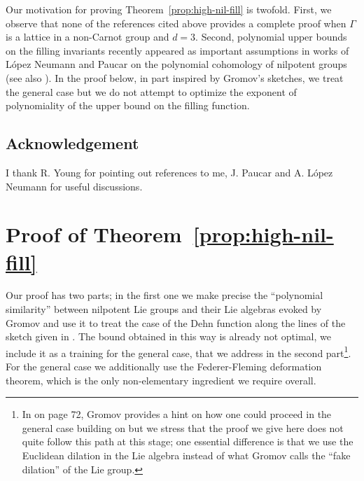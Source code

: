 \documentclass[12pt]{amsart}
\theoremstyle{definition}
\begin{document}
Our motivation for proving Theorem~\ref{prop:high-nil-fill} is twofold. First, we observe that none of the references cited above provides a complete proof when $\Gamma$ is a lattice in a non-Carnot group and $d=3$. Second, polynomial upper bounds on the filling invariants recently appeared as important assumptions in works of L\'opez Neumann and Paucar \cite{neumann2026quantitativepolynomialcohomologyapplications} on the polynomial cohomology of nilpotent groups (see also \cite{bader2026higherkazhdanpropertyunitary}).
In the proof below, in part inspired by Gromov's sketches, we treat the general case but we do not attempt to optimize the exponent of polynomiality of the upper bound on the filling function.

\subsection{Acknowledgement}
I thank R. Young for pointing out references to me, J. Paucar and A. L\'opez Neumann for useful discussions.

\section{Proof of Theorem~\ref{prop:high-nil-fill}}

Our proof has two parts; in the first one we make precise the ``polynomial similarity'' between nilpotent Lie groups and their Lie algebras evoked by Gromov \cite[5.A\textsubscript{2}]{GromovAI} and use it to treat the case of the Dehn function along the lines of the sketch given in \cite[pp.56-57]{GromovAI}. The bound obtained in this way is already not optimal, we include it as a training for the general case, that we address in the second part\footnote{In \cite{GromovAI} on page 72, Gromov provides a hint on how one could proceed in the general case building on \cite[5.A\textsubscript{5}]{GromovAI} but we stress that the proof we give here does not quite follow this path at this stage; one  essential difference is that we use the Euclidean dilation in the Lie algebra instead of what Gromov calls the ``fake dilation'' of the Lie group.}. For the general case we additionally use the Federer-Fleming deformation theorem, which is the only non-elementary ingredient we require overall.
\end{document}
